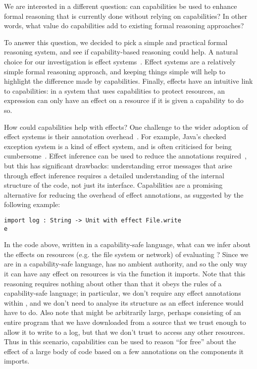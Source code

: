 We are interested in a different question: can capabilities be used to
enhance formal reasoning that is currently done without relying on
capabilities?  In other words, what value do capabilities add to
existing formal reasoning approaches?

To answer this question, we decided to pick a simple and practical
formal reasoning system, and see if capability-based reasoning could
help.  A natural choice for our investigation is effect
systems~\cite{nielson99}.  Effect systems are a relatively simple
formal reasoning approach, and keeping things simple will help to
highlight the difference made by capabilities.  Finally, effects have
an intuitive link to capabilities: in a system that uses capabilities
to protect resources, an expression can only have an effect on a
resource if it is given a capability to do so.

How could capabilities help with effects?  One challenge to the wider
adoption of effect systems is their annotation overhead~\cite{rytz12}.
For example, Java's checked exception system is a kind of effect
system, and is often criticised for being
cumbersome~\cite{Kiniry2006}.  Effect inference can be used to reduce
the annotations required~\cite{koka14}, but this has significant
drawbacks: understanding error messages that arise through effect
inference requires a detailed understanding of the internal structure
of the code, not just its interface.  Capabilities are a promising
alternative for reducing the overhead of effect annotations, as
suggested by the following example:

\begin{lstlisting}
import log : String -> Unit with effect File.write
e
\end{lstlisting}

In the code above, written in a capability-safe language, what can we
infer about the effects on resources (e.g. the file system or network)
of evaluating ?  Since we are in a capability-safe language,
 has no ambient authority, and so the only way it can have any
effect on resources is via the  function it imports.  Note
that this reasoning requires nothing about  other than that it
obeys the rules of a capability-safe language; in particular, we don't
require any effect annotations within , and we don't need to
analyse its structure as an effect inference would have to do.  Also
note that  might be arbitrarily large, perhaps consisting of
an entire program that we have downloaded from a source that we trust
enough to allow it to write to a log, but that we don't trust to
access any other resources.  Thus in this scenario, capabilities can
be used to reason ``for free'' about the effect of a large body of
code based on a few annotations on the components it imports.

